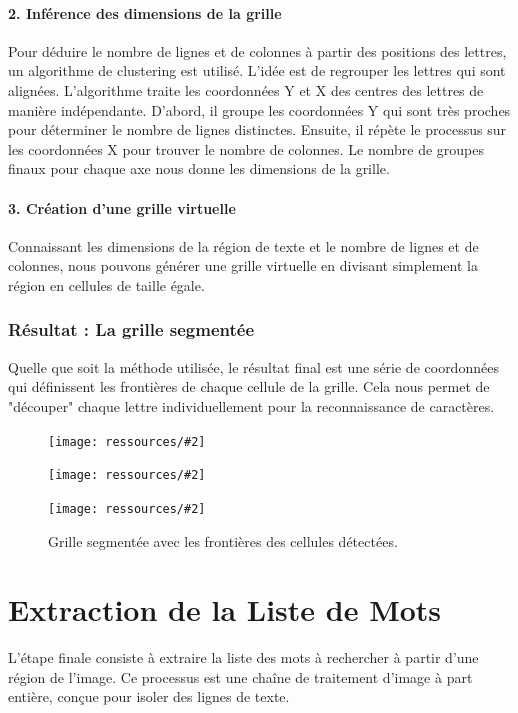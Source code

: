 \documentclass{article}
\newcommand{\stepimage}[3][0.3\textwidth]{%
  \minipage{#1}
    \texttt{[image: ressources/\#2]}
    \caption{#3}
  \endminipage\hfill
}
\begin{document}
\paragraph{2. Inférence des dimensions de la grille}
Pour déduire le nombre de lignes et de colonnes à partir des positions des lettres, un algorithme de clustering est utilisé. L'idée est de regrouper les lettres qui sont alignées. L'algorithme traite les coordonnées Y et X des centres des lettres de manière indépendante. D'abord, il groupe les coordonnées Y qui sont très proches pour déterminer le nombre de lignes distinctes. Ensuite, il répète le processus sur les coordonnées X pour trouver le nombre de colonnes. Le nombre de groupes finaux pour chaque axe nous donne les dimensions de la grille.

\paragraph{3. Création d'une grille virtuelle}
Connaissant les dimensions de la région de texte et le nombre de lignes et de colonnes, nous pouvons générer une grille virtuelle en divisant simplement la région en cellules de taille égale.

\subsubsection{Résultat : La grille segmentée}

Quelle que soit la méthode utilisée, le résultat final est une série de coordonnées qui définissent les frontières de chaque cellule de la grille. Cela nous permet de "découper" chaque lettre individuellement pour la reconnaissance de caractères.

\begin{figure}[H]
    \stepimage[0.30\textwidth]{1step_10_reconstructed_grid.png}{}
    \stepimage[0.33\textwidth]{2step_10_reconstructed_grid.png}{}
    \stepimage[0.26\textwidth]{3step_10_reconstructed_grid.png}{}
    \caption{Grille segmentée avec les frontières des cellules détectées.}
\end{figure}

\section{Extraction de la Liste de Mots}
L'étape finale consiste à extraire la liste des mots à rechercher à partir d'une région de l'image. Ce processus est une chaîne de traitement d'image à part entière, conçue pour isoler des lignes de texte.
\end{document}
